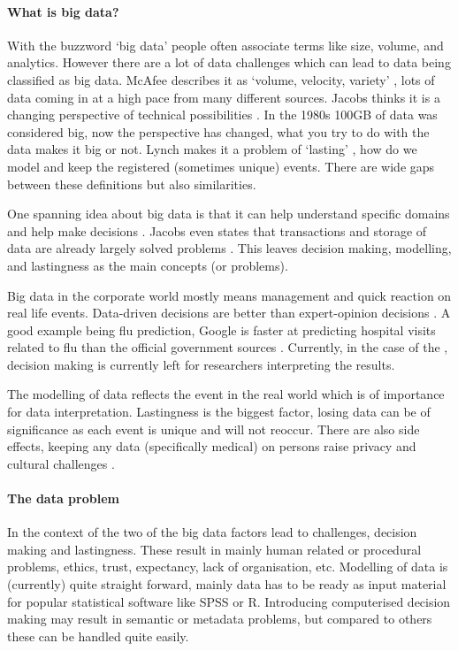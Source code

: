 \paragraph{What is big data?}
With the buzzword `big data' people often associate terms like size, volume, and analytics.
However there are a lot of data challenges which can lead to data being classified as big data.
McAfee describes it as `volume, velocity, variety' \cite{dsb1mcafee}, lots of data coming in at a high pace from many different sources.
Jacobs thinks it is a changing perspective of technical possibilities \cite{dsb5jacobs}.
In the 1980s 100GB of data was considered big, now the perspective has changed, what you try to do with the data makes it big or not.
Lynch makes it a problem of `lasting' \cite{dsb3lynch}, how do we model and keep the registered (sometimes unique) events.
There are wide gaps between these definitions but also similarities.

One spanning idea about big data is that it can help understand specific domains and help make decisions \cite{dsb2lohr}.
Jacobs even states that transactions and storage of data are already largely solved problems \cite{dsb5jacobs}.
This leaves decision making, modelling, and lastingness as the main concepts (or problems).

Big data in the corporate world mostly means management and quick reaction on real life events.
Data-driven decisions are better than expert-opinion decisions \cite{dsb1mcafee}. 
A good example being flu prediction, Google is faster at predicting hospital visits related to flu than the official government sources \cite{dsb8dugas, dsb1mcafee}.
Currently, in the case of the \project{}, decision making is currently left for researchers interpreting the results.

The modelling of data reflects the event in the real world which is of importance for data interpretation.
Lastingness is the biggest factor, \eg{} losing data can be of significance as each event is unique and will not reoccur.
There are also side effects, keeping any data (specifically medical) on persons raise privacy and cultural challenges \cite{dsb1mcafee}.

\paragraph{The data problem}
In the context of the \project{} two of the big data factors lead to challenges, decision making and lastingness.
These result in mainly human related or procedural problems, \eg{} ethics, trust, expectancy, lack of organisation, etc.
Modelling of data is (currently) quite straight forward, mainly data has to be ready as input material for popular statistical software like SPSS or R.
Introducing computerised decision making may result in semantic or metadata problems, but compared to others these can be handled quite easily.

